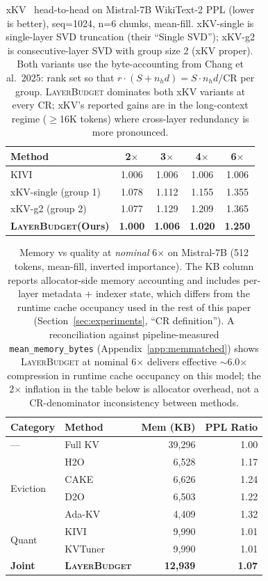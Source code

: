 \documentclass{article}
\newcommand{\layerbudget}{\textsc{LayerBudget}\xspace}
\begin{document}
\begin{table}[h]
\centering
\caption{xKV~\citep{xkv2025} head-to-head on Mistral-7B WikiText-2 PPL (lower is better), seq=1024, n=6 chunks, mean-fill.
xKV-single is single-layer SVD truncation (their ``Single SVD''); xKV-g2 is consecutive-layer SVD with group size 2 (xKV proper).
Both variants use the byte-accounting from Chang et al.\ 2025: rank set so that $r \cdot (S + n_h d) = S \cdot n_h d / \text{CR}$ per group.
\layerbudget dominates both xKV variants at every CR; xKV's reported gains are in the long-context regime ($\geq$16K tokens) where cross-layer redundancy is more pronounced.}
\label{tab:xkv-vs-lb}
\small
\begin{tabular}{@{}lcccc@{}}
\toprule
Method & 2$\times$ & 3$\times$ & 4$\times$ & 6$\times$ \\
\midrule
KIVI                    & 1.006 & 1.006 & 1.006 & 1.006 \\
xKV-single (group 1)    & 1.078 & 1.112 & 1.155 & 1.355 \\
xKV-g2 (group 2)        & 1.077 & 1.129 & 1.209 & 1.365 \\
\textbf{\layerbudget (Ours)} & \textbf{1.000} & \textbf{1.006} & \textbf{1.020} & \textbf{1.250} \\
\bottomrule
\end{tabular}
\end{table}

\begin{table}[h]
\centering
\caption{Memory vs quality at \emph{nominal} 6$\times$ on Mistral-7B (512 tokens, mean-fill, inverted importance).
The KB column reports allocator-side memory accounting and includes per-layer metadata + indexer state, which differs from the runtime cache occupancy used in the rest of this paper (Section~\ref{sec:experiments}, ``CR definition'').
A reconciliation against pipeline-measured \texttt{mean\_memory\_bytes} (Appendix~\ref{app:memmatched}) shows \layerbudget at nominal 6$\times$ delivers effective $\sim$6.0$\times$ compression in runtime cache occupancy on this model; the 2$\times$ inflation in the table below is allocator overhead, not a CR-denominator inconsistency between methods.}
\label{tab:memory}
\small
\begin{tabular}{@{}llrr@{}}
\toprule
Category & Method & Mem (KB) & PPL Ratio \\
\midrule
--- & Full KV & 39,296 & 1.00 \\
\midrule
\multirow{4}{*}{Eviction}
& H2O & 6,528 & 1.17 \\
& CAKE & 6,626 & 1.24 \\
& D2O & 6,503 & 1.22 \\
& Ada-KV & 4,409 & 1.32 \\
\midrule
\multirow{2}{*}{Quant}
& KIVI & 9,990 & 1.01 \\
& KVTuner & 9,990 & 1.01 \\
\midrule
\textbf{Joint} & \textbf{\layerbudget} & \textbf{12,939} & \textbf{1.07} \\
\bottomrule
\end{tabular}
\end{table}
\end{document}
